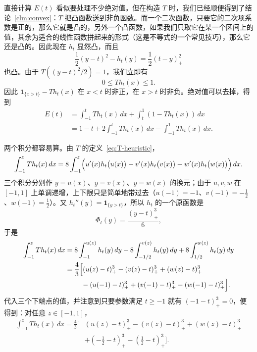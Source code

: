 \documentclass[UTF8,fontset=windows,a4paper,11pt]{ctexart}
\begin{document}
直接计算 $E(t)$ 看似要处理不少绝对值。但在构造 $T$ 时，我们已经顺便得到了结论~\ref{clm:convex}：$T$ 把凸函数送到非负函数。而一个二次函数，只要它的二次项系数是正的，那么它就是凸的，另外一个凸函数，如果我们只取它在某一个区间上的值，其余为适合的线性函数拼起来的形式（这是不等式的一个常见技巧），那么它还是凸的。因此现在 $h_t$ 显然凸，而且
\[
    \frac12(y-t)^2-h_t(y)=\frac12(t-y)_+^2
\]
也凸。由于 $T((y-t)^2/2)=1$，我们立即有
\begin{equation}
    0\le Th_t(x)\le1.
    \label{eq:Th-range}
\end{equation}
因此 $\mathbf1_{\{x>t\}}-Th_t(x)$ 在 $x<t$ 时非正，在 $x>t$ 时非负。绝对值可以去掉，得到
\begin{align}
    E(t)
    &=\int_{-1}^{t}Th_t(x)\,dx+\int_t^1(1-Th_t(x))\,dx\\
    &=1-t+2\int_{-1}^{t}Th_t(x)\,dx-\int_{-1}^{1}Th_t(x)\,dx.
    \label{eq:E-integral}
\end{align}

两个积分都容易算。由 $T$ 的定义~\eqref{eq:T-heuristic}，
\[
    \int_{-1}^{z}Th_t(x)\,dx
    =8\int_{-1}^{z}\Bigl(u'(x)h_t\bigl(u(x)\bigr)-v'(x)h_t\bigl(v(x)\bigr)+w'(x)h_t\bigl(w(x)\bigr)\Bigr)\,dx.
\]
三个积分分别作 $y=u(x)$、$y=v(x)$、$y=w(x)$ 的换元；由于 $u,v,w$ 在 $[-1,1]$ 上单调递增，上下限只是简单地带过去（$u(-1)=-1$、$v(-1)=-\frac12$、$w(-1)=\frac12$）。又 $h_t''(y)=\mathbf 1_{\{y>t\}}$，所以 $h_t$ 的一个原函数是
\[
    \Phi_t(y)=\frac{(y-t)_+^3}{6},
\]
于是
\begin{align*}
    \int_{-1}^{z}Th_t(x)\,dx
    &=8\int_{-1}^{u(z)}h_t(y)\,dy-8\int_{-1/2}^{v(z)}h_t(y)\,dy+8\int_{1/2}^{w(z)}h_t(y)\,dy\\
    &=\frac43\Bigl[(u(z)-t)_+^3-(v(z)-t)_+^3+(w(z)-t)_+^3\\
    &\qquad\ -(u(-1)-t)_+^3+(v(-1)-t)_+^3-(w(-1)-t)_+^3\Bigr].
\end{align*}
代入三个下端点的值，并注意到只要参数满足 $t\ge-1$ 就有 $(-1-t)_+^3=0$，便得到：对任意 $z\in[-1,1]$，
\begin{align}
    \int_{-1}^{z}Th_t(x)\,dx
     =\frac43\bigl[&(u(z)-t)_+^3-(v(z)-t)_+^3+(w(z)-t)_+^3\\
     &+(-\tfrac12-t)_+^3-(\tfrac12-t)_+^3\bigr].
    \label{eq:primitive-Th}
\end{align}
\end{document}
